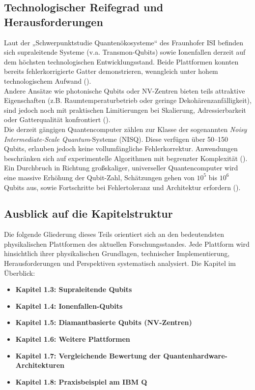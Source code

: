 \subsection{Technologischer Reifegrad und Herausforderungen}
Laut der „Schwerpunktstudie Quantenökosysteme“ des Fraunhofer ISI befinden sich supraleitende Systeme (v.a. Transmon-Qubits) sowie Ionenfallen derzeit auf dem höchsten technologischen Entwicklungsstand. Beide Plattformen konnten bereits fehlerkorrigierte Gatter demonstrieren, wenngleich unter hohem technologischem Aufwand (\cite{schmaltzQuantentechnologienUndQuantenOkosysteme2025}).
\\
Andere Ansätze wie photonische Qubits oder NV-Zentren bieten teils attraktive Eigenschaften (z.B. Raumtemperaturbetrieb oder geringe Dekohärenzanfälligkeit), sind jedoch noch mit praktischen Limitierungen bei Skalierung, Adressierbarkeit oder Gatterqualität konfrontiert (\cite{homeisterQuantumComputingVerstehen2015}).
\\
Die derzeit gängigen Quantencomputer zählen zur Klasse der sogenannten \textit{Noisy Intermediate-Scale Quantum}-Systeme (NISQ). Diese verfügen über 50–150 Qubits, erlauben jedoch keine vollumfängliche Fehlerkorrektur. Anwendungen beschränken sich auf experimentelle Algorithmen mit begrenzter Komplexität (\cite{schmaltzQuantentechnologienUndQuantenOkosysteme2025, homeisterQuantumComputingVerstehen2015}).
\\
Ein Durchbruch in Richtung großskaliger, universeller Quantencomputer wird eine massive Erhöhung der Qubit-Zahl, Schätzungen gehen von $10^5$ bis $10^6$ Qubits aus, sowie Fortschritte bei Fehlertoleranz und Architektur erfordern (\cite{schmaltzQuantentechnologienUndQuantenOkosysteme2025}).

\subsection{Ausblick auf die Kapitelstruktur}
Die folgende Gliederung dieses Teils orientiert sich an den bedeutendsten physikalischen Plattformen des aktuellen Forschungsstandes. Jede Plattform wird hinsichtlich ihrer physikalischen Grundlagen, technischer Implementierung, Herausforderungen und Perspektiven systematisch analysiert. Die Kapitel im Überblick:

\begin{itemize}
\item \textbf{Kapitel 1.3: Supraleitende Qubits}
\item \textbf{Kapitel 1.4: Ionenfallen-Qubits}
\item \textbf{Kapitel 1.5: Diamantbasierte Qubits (NV-Zentren)}
\item \textbf{Kapitel 1.6: Weitere Plattformen}
\item \textbf{Kapitel 1.7: Vergleichende Bewertung der Quantenhardware-Architekturen} 
\item \textbf{Kapitel 1.8: Praxisbeispiel am IBM Q}
\end{itemize}

